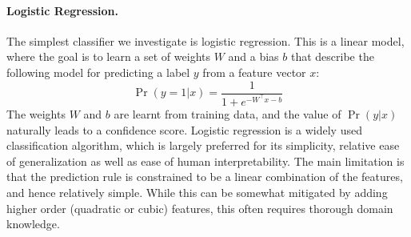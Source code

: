  

\paragraph{Logistic Regression.} The simplest classifier we investigate is logistic regression. This is a linear model, where the goal is to learn a set of weights $W$ and a bias $b$ that describe the following model for predicting a label $y$ from a feature vector $x$:
\[ \Pr(y = 1 | x) = \frac{1}{1 + e^{-W^{\top} x - b}} \]
The weights $W$ and $b$ are learnt from training data, and the value of $\Pr(y | x)$ naturally leads to a confidence score. Logistic regression is a widely used classification algorithm, which is largely preferred for its simplicity, relative ease of generalization as well as ease of human interpretability. The main limitation is that the prediction rule is constrained to be a linear combination of the features, and hence relatively simple. While this can be somewhat mitigated by adding higher order (quadratic or cubic) features, this often requires thorough domain knowledge.



%
%

